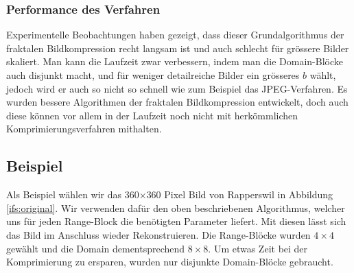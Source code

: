 \subsubsection{Performance des Verfahren}
Experimentelle Beobachtungen haben gezeigt, dass dieser Grundalgorithmus der fraktalen Bildkompression recht langsam ist und auch schlecht für grössere Bilder skaliert.
Man kann die Laufzeit zwar verbessern, indem man die Domain-Blöcke auch disjunkt macht, und für weniger detailreiche Bilder ein grösseres $b$ wählt, jedoch wird er auch so nicht so schnell wie zum Beispiel das JPEG-Verfahren.
%
Es wurden bessere Algorithmen der fraktalen Bildkompression entwickelt, doch auch diese können vor allem in der Laufzeit noch nicht mit herkömmlichen Komprimierungsverfahren mithalten.

\subsection{Beispiel}
Als Beispiel wählen wir das 360$\times$360 Pixel Bild von Rapperswil in Abbildung \ref{ifs:original}.
%
Wir verwenden dafür den oben beschriebenen Algorithmus, welcher uns für jeden Range-Block die benötigten Parameter liefert.
Mit diesen lässt sich das Bild im Anschluss wieder Rekonstruieren.
Die Range-Blöcke wurden $4\times4$ gewählt und die Domain dementsprechend $8\times8$.
Um etwas Zeit bei der Komprimierung zu ersparen, wurden nur disjunkte Domain-Blöcke gebraucht.

